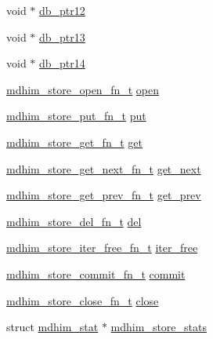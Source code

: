 \begin{DoxyCompactItemize}
\item 
void $\ast$ \hyperlink{structmdhim__store__t_a9c6398ca2b628620f016978c0da65a67}{db\-\_\-ptr12}
\item 
void $\ast$ \hyperlink{structmdhim__store__t_a74eff2c8440d426ba60ffcf037a11b4a}{db\-\_\-ptr13}
\item 
void $\ast$ \hyperlink{structmdhim__store__t_aac29ef96c83258441f7e697e2e87abdc}{db\-\_\-ptr14}
\item 
\hyperlink{data__store_8h_a44d8a5b415c89e7fed71af96ace09e27}{mdhim\-\_\-store\-\_\-open\-\_\-fn\-\_\-t} \hyperlink{structmdhim__store__t_a8d77b86eb31d677f36b46f653865ea1d}{open}
\item 
\hyperlink{data__store_8h_a53be65de68e4f03efc8816cdd2ce65b8}{mdhim\-\_\-store\-\_\-put\-\_\-fn\-\_\-t} \hyperlink{structmdhim__store__t_a5a33c9ea5897fdf71a54573ea49fef18}{put}
\item 
\hyperlink{data__store_8h_a39ec0bff4eb89b9081fdaaa94700766f}{mdhim\-\_\-store\-\_\-get\-\_\-fn\-\_\-t} \hyperlink{structmdhim__store__t_a6ad0450519e040a4ae11631aa6202b24}{get}
\item 
\hyperlink{data__store_8h_a012fd08fcc7f06da0e4a57656038c394}{mdhim\-\_\-store\-\_\-get\-\_\-next\-\_\-fn\-\_\-t} \hyperlink{structmdhim__store__t_a0e42f0e911de2adb2616228f3ffbfd99}{get\-\_\-next}
\item 
\hyperlink{data__store_8h_a59ef8747e7f140c68bd8fff69a583eea}{mdhim\-\_\-store\-\_\-get\-\_\-prev\-\_\-fn\-\_\-t} \hyperlink{structmdhim__store__t_a43c5445119b911e3da419f26c5aae232}{get\-\_\-prev}
\item 
\hyperlink{data__store_8h_aabc5c9879c73c85349c660530f687f52}{mdhim\-\_\-store\-\_\-del\-\_\-fn\-\_\-t} \hyperlink{structmdhim__store__t_a3cf5374069e55121b50e4567a1e5e2e1}{del}
\item 
\hyperlink{data__store_8h_ae1d0aa9a10749f38825b64354388c302}{mdhim\-\_\-store\-\_\-iter\-\_\-free\-\_\-fn\-\_\-t} \hyperlink{structmdhim__store__t_ab572d429dc38a940f922866bc328e809}{iter\-\_\-free}
\item 
\hyperlink{data__store_8h_acbf72a3c5eaa36c296d1ecf18ab6e1ed}{mdhim\-\_\-store\-\_\-commit\-\_\-fn\-\_\-t} \hyperlink{structmdhim__store__t_ae67ea767684de68875b9bfda9cdb8c08}{commit}
\item 
\hyperlink{data__store_8h_a07e2ae82dfe71d97db0129a9e8d29eeb}{mdhim\-\_\-store\-\_\-close\-\_\-fn\-\_\-t} \hyperlink{structmdhim__store__t_a41daefe3effd7441930c4296fb6002de}{close}
\item 
struct \hyperlink{structmdhim__stat}{mdhim\-\_\-stat} $\ast$ \hyperlink{structmdhim__store__t_a1492cc46cbe9e18147fd957db92afa47}{mdhim\-\_\-store\-\_\-stats}
\end{DoxyCompactItemize}


